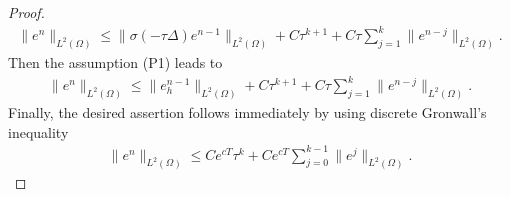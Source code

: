 \documentclass[a4paper, oneside]{book}
\def\II{(\Omega)}
\begin{document}
\begin{proof}
\begin{align*}
\|  e ^n \|_{L^2\II} \le \|  \sigma(-\tau \Delta)e ^{n-1} \|_{L^2\II}  +  C \tau^{k+1}  + C \tau \sum_{j=1}^k \|  e^{n-j}  \|_{L^2\II}.
\end{align*}
Then the assumption (P1) leads to
\begin{align*}
\|  e ^n \|_{L^2\II} \le \|  e_h^{n-1} \|_{L^2\II}  +  C \tau^{k+1}  + C \tau \sum_{j=1}^k \|  e^{n-j}  \|_{L^2\II}.
\end{align*}
Finally, the desired assertion follows immediately by using discrete Gronwall's inequality
\begin{align*}
\|  e ^n \|_{L^2\II}  \le  C e^{cT} \tau^{k}  + C e^{cT}  \sum_{j=0}^{k-1} \|  e^{j}  \|_{L^2\II}.
\end{align*}
\end{proof}

\end{document}
